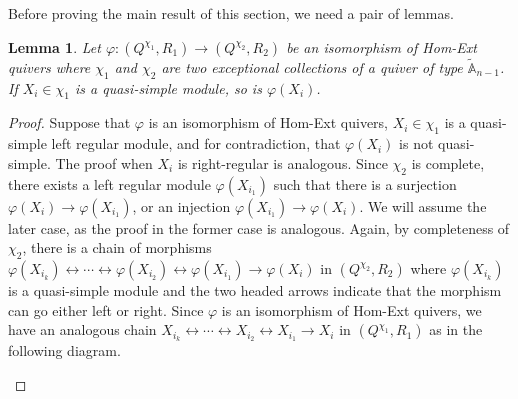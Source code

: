 \documentclass[12pt]{amsart}
\theoremstyle{plain}
\newtheorem{lem}[thm]{Lemma}
\theoremstyle{definition}
\theoremstyle{remark}
\begin{document}
{\color{black} Before proving the main result of this section, we need a pair of lemmas.

\begin{lem}\label{lem: iso sends simple to simple}
    Let $\varphi:(Q^{\chi_1},R_1) \rightarrow (Q^{\chi_2},R_2)$ be an isomorphism of Hom-Ext quivers where $\chi_1$ and $\chi_2$ are two exceptional collections of a quiver of type $\tilde{\mathbb{A}}_{n-1}$. If $X_i \in \chi_1$ is a quasi-simple module, so is $\varphi(X_i)$.
\end{lem}

\begin{proof}
    Suppose that $\varphi$ is an isomorphism of Hom-Ext quivers, $X_i\in \chi_1$ is a quasi-simple left regular module, and for contradiction, that $\varphi(X_i)$ is not quasi-simple. The proof when $X_i$ is right-regular is analogous. Since $\chi_2$ is complete, there exists a left regular module $\varphi(X_{i_1})$ such that there is a surjection $\varphi(X_i) \rightarrow \varphi(X_{i_1})$, or an injection $\varphi(X_{i_1}) \rightarrow \varphi(X_i)$. We will assume the later case, as the proof in the former case is analogous. Again, by completeness of $\chi_2$, there is a chain of morphisms $\varphi(X_{i_k}) \leftrightarrow \cdots \leftrightarrow \varphi(X_{i_2}) \leftrightarrow \varphi(X_{i_1}) \rightarrow \varphi(X_i)$ in $(Q^{\chi_2},R_2)$ where $\varphi(X_{i_k})$ is a quasi-simple module and the two headed arrows indicate that the morphism can go either left or right. Since $\varphi$ is an isomorphism of Hom-Ext quivers, we have an analogous chain $X_{i_k} \leftrightarrow \cdots \leftrightarrow X_{i_2} \leftrightarrow X_{i_1} \rightarrow X_i$  in $(Q^{\chi_1},R_1)$ as in the following diagram.

\begin{center}



\begin{tikzpicture}[x=0.75pt,y=0.75pt,yscale=-1,xscale=1]


\end{tikzpicture}
\end{center}
\end{proof}}
\end{document}
